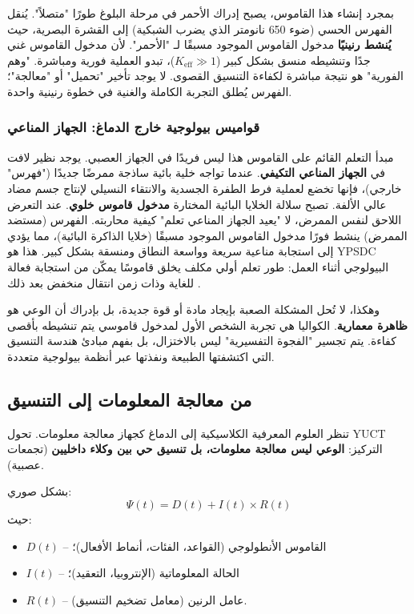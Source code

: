 \documentclass[12pt,a4paper]{article}
\begin{document}
	بمجرد إنشاء هذا القاموس، يصبح إدراك الأحمر في مرحلة البلوغ طورًا "متصلاً". يُنقل الفهرس الحسي (ضوء 650 نانومتر الذي يضرب الشبكية) إلى القشرة البصرية، حيث \textbf{يُنشط رنينيًا} مدخول القاموس الموجود مسبقًا لـ "الأحمر". لأن مدخول القاموس غني جدًا وتنشيطه منسق بشكل كبير (\(K_{\mathrm{eff}} \gg 1\))، تبدو العملية فورية ومباشرة. "وهم الفورية" هو نتيجة مباشرة لكفاءة التنسيق القصوى. لا يوجد تأخير "تحميل" أو "معالجة"؛ الفهرس يُطلق التجربة الكاملة والغنية في خطوة رنينية واحدة.
	
	\subsubsection{قواميس بيولوجية خارج الدماغ: الجهاز المناعي}
	
	مبدأ التعلم القائم على القاموس هذا ليس فريدًا في الجهاز العصبي. يوجد نظير لافت في \textbf{الجهاز المناعي التكيفي}. عندما تواجه خلية بائية ساذجة ممرضًا جديدًا ("فهرس" خارجي)، فإنها تخضع لعملية فرط الطفرة الجسدية والانتقاء النسيلي لإنتاج جسم مضاد عالي الألفة. تصبح سلالة الخلايا البائية المختارة \textbf{مدخول قاموس خلوي}. عند التعرض اللاحق لنفس الممرض، لا "يعيد الجهاز المناعي تعلم" كيفية محاربته. الفهرس (مستضد الممرض) ينشط فورًا مدخول القاموس الموجود مسبقًا (خلايا الذاكرة البائية)، مما يؤدي إلى استجابة مناعية سريعة وواسعة النطاق ومنسقة بشكل كبير. هذا هو YPSDC البيولوجي أثناء العمل: طور تعلم أولي مكلف يخلق قاموسًا يمكّن من استجابة فعالة للغاية وذات زمن انتقال منخفض بعد ذلك \cite{Alberts2014}.
	
	وهكذا، لا تُحل المشكلة الصعبة بإيجاد مادة أو قوة جديدة، بل بإدراك أن الوعي هو \textbf{ظاهرة معمارية}. الكواليا هي تجربة الشخص الأول لمدخول قاموسي يتم تنشيطه بأقصى كفاءة. يتم تجسير "الفجوة التفسيرية" ليس بالاختزال، بل بفهم مبادئ هندسة التنسيق التي اكتشفتها الطبيعة ونفذتها عبر أنظمة بيولوجية متعددة.
	
	\subsection{من معالجة المعلومات إلى التنسيق}
	
	تنظر العلوم المعرفية الكلاسيكية إلى الدماغ كجهاز معالجة معلومات. تحول YUCT التركيز: \textbf{الوعي ليس معالجة معلومات، بل تنسيق حي بين وكلاء داخليين} (تجمعات عصبية).
	
	بشكل صوري:
	\[
	\Psi(t) = D(t) + I(t) \times R(t)
	\]
	حيث:
	\begin{itemize}
		\item $D(t)$ – القاموس الأنطولوجي (القواعد، الفئات، أنماط الأفعال)؛
		\item $I(t)$ – الحالة المعلوماتية (الإنتروبيا، التعقيد)؛
		\item $R(t)$ – عامل الرنين (معامل تضخيم التنسيق).
	\end{itemize}
	
\end{document}
